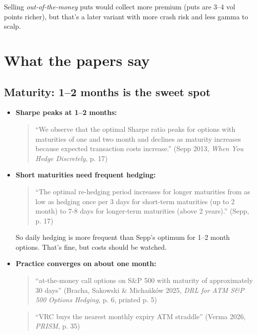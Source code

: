 \documentclass{article}
\begin{document}
Selling \emph{out-of-the-money} puts would collect more premium (puts are 3--4 vol points richer), but that's a later variant with more crash risk and less gamma to scalp.

\section{What the papers say}

\subsection{Maturity: 1--2 months is the sweet spot}

\begin{itemize}

\item \textbf{Sharpe peaks at 1--2 months:}

\begin{quote}``We observe that the optimal Sharpe ratio peaks for options with maturities of one and two month and declines as maturity increases because expected transaction costs increase.'' (Sepp 2013, \emph{When You Hedge Discretely}, p. 17)\end{quote}

\item \textbf{Short maturities need frequent hedging:}

\begin{quote}``The optimal re-hedging period increases for longer maturities from as low as hedging once per 3 days for short-term maturities (up to 2 month) to 7-8 days for longer-term maturities (above 2 years).'' (Sepp, p. 17)\end{quote}

So daily hedging is more frequent than Sepp's optimum for 1--2 month options. That's fine, but costs should be watched.

\item \textbf{Practice converges on about one month:}

\begin{quote}``at-the-money call options on S\&P 500 with maturity of approximately 30 days'' (Bracha, Sakowski \& Michańków 2025, \emph{DRL for ATM S\&P 500 Options Hedging}, p. 6, printed p. 5)\end{quote}

\begin{quote}``VRC buys the nearest monthly expiry ATM straddle'' (Verma 2026, \emph{PRISM}, p. 35)\end{quote}


\end{itemize}
\end{document}
